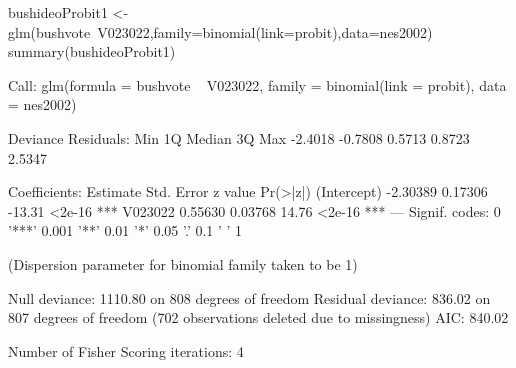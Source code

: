 \begin{Schunk}
\begin{Sinput}
 bushideoProbit1 <- glm(bushvote~V023022,family=binomial(link=probit),data=nes2002) 
 summary(bushideoProbit1)
\end{Sinput}
\begin{Soutput}
Call:
glm(formula = bushvote ~ V023022, family = binomial(link = probit), 
    data = nes2002)

Deviance Residuals: 
    Min       1Q   Median       3Q      Max  
-2.4018  -0.7808   0.5713   0.8723   2.5347  

Coefficients:
            Estimate Std. Error z value Pr(>|z|)    
(Intercept) -2.30389    0.17306  -13.31   <2e-16 ***
V023022      0.55630    0.03768   14.76   <2e-16 ***
---
Signif. codes:  0 '***' 0.001 '**' 0.01 '*' 0.05 '.' 0.1 ' ' 1

(Dispersion parameter for binomial family taken to be 1)

    Null deviance: 1110.80  on 808  degrees of freedom
Residual deviance:  836.02  on 807  degrees of freedom
  (702 observations deleted due to missingness)
AIC: 840.02

Number of Fisher Scoring iterations: 4
\end{Soutput}
\end{Schunk}
